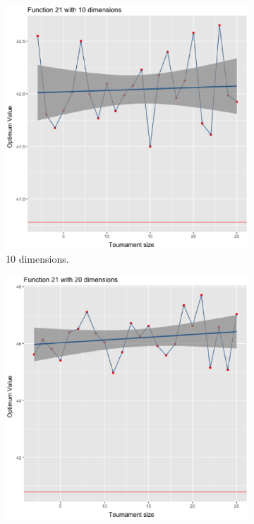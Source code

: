 \begin{figure}[t]
	\begin{subfigure}[b]{0.33\textwidth}
		\centering
		\includegraphics[width=\textwidth]{img/21dim_10.ps}
		\caption{10 dimensions.}
	\end{subfigure}
	\begin{subfigure}[b]{0.33\textwidth}
		\centering
		\includegraphics[width=\textwidth]{img/21dim_20.ps}

\end{subfigure}
\end{figure}
